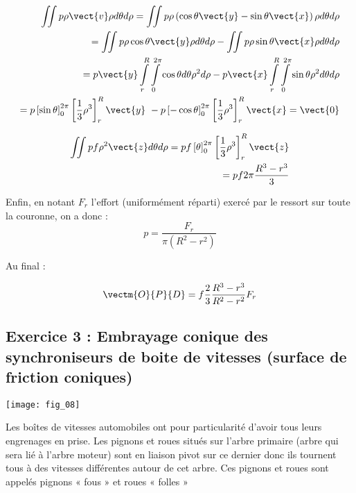 \begin{corrige}
\begin{eqnarray*}
\iint p\rho\vect{v} \rho d\theta d\rho = \iint p\rho\left(\cos\theta\vect{y}-\sin\theta\vect{x} \right) \rho d\theta d\rho \\
=\iint p\rho\cos\theta\vect{y}  \rho d\theta d\rho-\iint p\rho \sin\theta\vect{x}  \rho d\theta d\rho \\
=p \vect{y}  \int\limits_{r}^{R} \int\limits_{0}^{2\pi}\cos\theta d\theta \rho^2 d\rho- p\vect{x}\int\limits_{r}^{R} \int\limits_{0}^{2\pi} \sin\theta  \rho^2 d\theta d\rho \\
=p \left[ \sin\theta\right]_{0}^{2\pi}\left[ \dfrac{1}{3}\rho^3\right]_{r}^{R}\vect{y}\
 -
p \left[ -\cos\theta\right]_{0}^{2\pi}\left[ \dfrac{1}{3}\rho^3\right]_{r}^{R}\vect{x} = \vect{0}
\end{eqnarray*}

\begin{eqnarray*}
\iint pf\rho^2 \vect{z} d\theta d\rho =
pf \left[ \theta\right]_{0}^{2\pi}\left[ \dfrac{1}{3}\rho^3\right]_{r}^{R} \vect{z}\\
= pf2\pi \dfrac{R^3-r^3}{3} 
\end{eqnarray*} 

Enfin, en notant $F_r$ l'effort (uniformément réparti) exercé par le ressort sur toute la couronne, on a donc :
$$
p=\dfrac{F_r}{\pi \left(R^2-r^2 \right)}
$$

Au final : 

$$ \vectm{O}{P}{D}  
= f\dfrac{2}{3} \dfrac{R^3-r^3}{R^2-r^2} F_r
$$
\end{corrige}

\else
\fi


\subsection*{Exercice 3 : Embrayage conique des synchroniseurs de boite de vitesses (surface de friction coniques)} 

\begin{marginfigure}
\texttt{[image: fig\_08]}
\end{marginfigure}

Les boîtes de vitesses automobiles ont pour particularité d'avoir tous leurs engrenages en prise. 
Les pignons et roues situés sur l’arbre primaire (arbre qui sera lié à l'arbre moteur) sont en liaison pivot sur ce dernier donc ils tournent tous à des vitesses différentes autour de cet arbre. Ces pignons et roues sont 
appelés pignons « fous » et roues « folles » 

